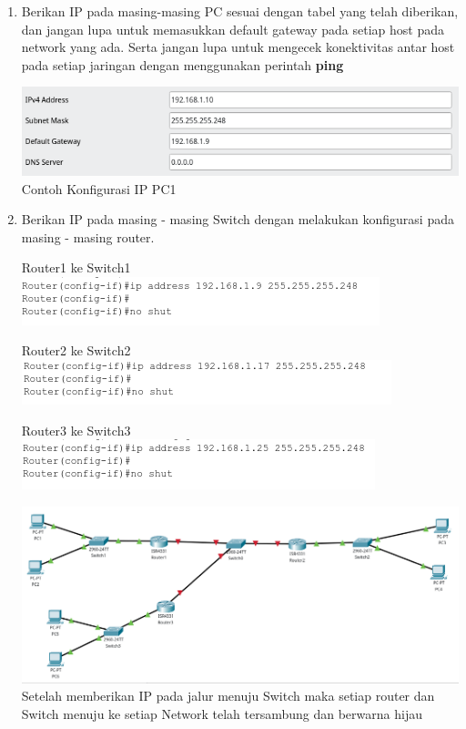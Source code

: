 \documentclass{article}
\begin{document}
\begin{flushleft}
\begin{enumerate}
            \item Berikan IP pada masing-masing PC sesuai dengan tabel yang telah diberikan, dan jangan lupa untuk memasukkan default gateway pada setiap host pada network yang ada. Serta jangan lupa untuk mengecek konektivitas antar host pada setiap jaringan dengan menggunakan perintah \textbf{ping}

            \includegraphics[scale=0.6]{1-2.png}
            Contoh Konfigurasi IP PC1

            \item Berikan IP pada masing - masing Switch dengan melakukan konfigurasi pada masing - masing router.

            Router1 ke Switch1
            \includegraphics[]{1-4.png}

            Router2 ke Switch2
            \includegraphics[]{1-5.png}

            Router3 ke Switch3
            \includegraphics[]{1-6.png}

            \includegraphics[scale=0.3]{1-7.png}
            Setelah memberikan IP pada jalur menuju Switch maka setiap router dan Switch menuju ke setiap Network telah tersambung dan berwarna hijau 


\end{enumerate}
\end{flushleft}
\end{document}
